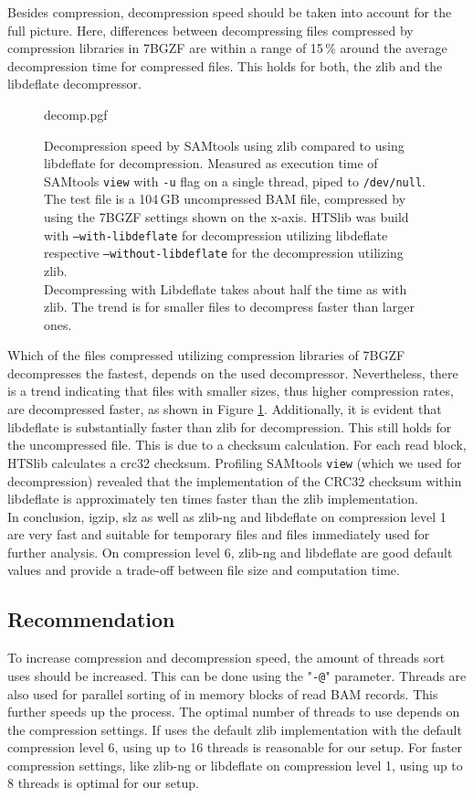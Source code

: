 Besides compression, decompression speed should be taken into account for the full picture. Here, differences between decompressing files compressed by compression libraries in 7BGZF are within a range of 15\,\% around the average decompression time for compressed files. This holds for both, the zlib and the libdeflate decompressor.
\begin{figure}[htb]
        {decomp.pgf}
    \caption{Decompression speed by SAMtools using zlib compared to using libdeflate for decompression. Measured as execution time of SAMtools \texttt{view} with \texttt{-u} flag on a single thread, piped to \texttt{/dev/null}. The test file is a 104\,GB uncompressed BAM file, compressed by \sort using the 7BGZF settings shown on the x-axis. \parents \threads \points HTSlib was build with \texttt{--with-libdeflate} for decompression utilizing libdeflate respective \texttt{--without-libdeflate} for the decompression utilizing zlib.\\
    Decompressing with Libdeflate takes about half the time as with zlib. The trend is for smaller files to decompress faster than larger ones.}
    \label{fig:decomp}
\end{figure}

Which of the files compressed utilizing compression libraries of 7BGZF decompresses the fastest, depends on the used decompressor. Nevertheless, there is a trend indicating that files with smaller sizes, thus higher compression rates, are decompressed faster, as shown in Figure \ref{fig:decomp}. 
Additionally, it is evident that libdeflate is substantially faster than zlib for decompression. This still holds for the uncompressed file. This is due to a checksum calculation. For each read block, HTSlib calculates a crc32 checksum. Profiling SAMtools \texttt{view} (which we used for decompression) revealed that the implementation of the CRC32 checksum within libdeflate is approximately ten times faster than the zlib implementation.\\

In conclusion, igzip, slz as well as zlib-ng and libdeflate on compression level 1 are very fast and suitable for temporary files and files immediately used for further analysis. On compression level 6, zlib-ng and libdeflate are good default values and provide a trade-off between file size and computation time. 

\subsection{Recommendation}
To increase compression and decompression speed, the amount of threads \sort sort uses should be increased. This can be done using the "\texttt{-@}" parameter. Threads are also used for parallel sorting of in memory blocks of read BAM records. This further speeds up the process. The optimal number of threads to use depends on the compression settings. If \sort uses the default zlib implementation with the default compression level 6, using up to 16 threads is reasonable for our setup. For faster compression settings, like zlib-ng or libdeflate on compression level 1, using up to 8 threads is optimal for our setup.


